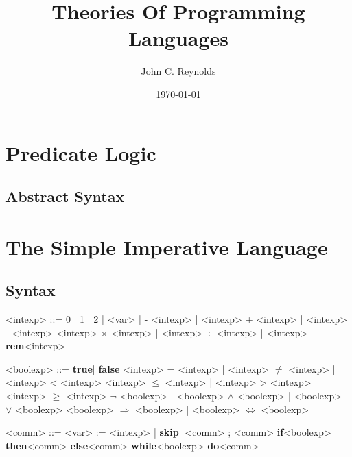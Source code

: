 \documentclass[11pt]{article}
\author{John C. Reynolds}
\date{\today}
\title{Theories Of Programming Languages}
\def \rem {\textbf{rem}}
\def \true {\textbf{true}}
\def \false {\textbf{false}}
\def \skip {\textbf{skip}}
\def \if {\textbf{if}}
\def \then {\textbf{then}}
\def \else {\textbf{else}}
\def \while {\textbf{while}}
\def \do {\textbf{do}}
\begin{document}
\maketitle
\tableofcontents

\section{Predicate Logic}
\label{sec:org908761b}
\subsection{Abstract Syntax}
\label{sec:orgb8c8325}

\section{The Simple Imperative Language}
\label{sec:org58931d8}

\subsection{Syntax}
\label{sec:org59a89e1}
\begin{grammar}
<intexp> ::= 0 | 1 |  2 | \cdots
\alt <var>  |  - <intexp> | <intexp> + <intexp> | <intexp> -  <intexp>
\alt <intexp> \(\times\) <intexp> | <intexp> \(\div\) <intexp> | <intexp> \rem <intexp>

<boolexp> ::= \true | \false
\alt <intexp> = <intexp> | <intexp> \(\neq\) <intexp> | <intexp> < <intexp>
\alt <intexp> \(\le\) <intexp> | <intexp> > <intexp> | <intexp> \(\ge\) <intexp>
\alt \(\neg\)  <boolexp> | <boolexp> \(\wedge\) <boolexp> | <boolexp> \(\vee\) <boolexp>
\alt <boolexp> \(\Rightarrow\) <boolexp> | <boolexp> \(\Leftrightarrow\) <boolexp>

<comm> ::= <var> := <intexp> | \skip | <comm> ; <comm>
\alt \if <boolexp> \then <comm> \else <comm>
\alt \while <boolexp> \do <comm>
\end{grammar}
\end{document}
